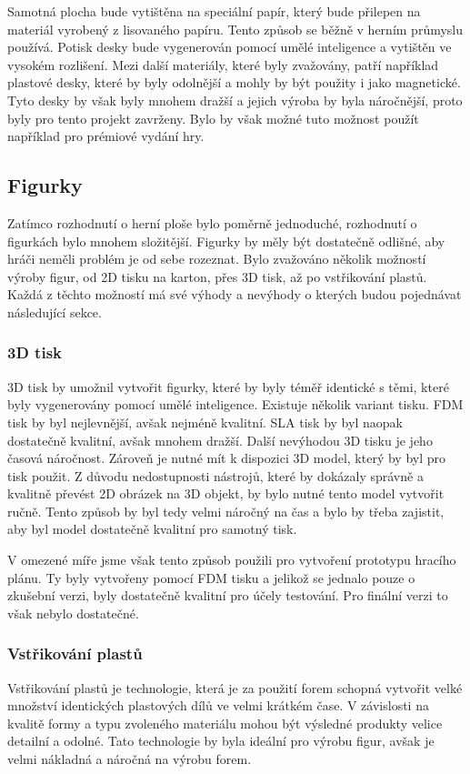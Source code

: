 Samotná plocha bude vytištěna na speciální papír, který bude přilepen na materiál vyrobený z lisovaného papíru. Tento způsob se běžně v herním průmyslu používá. Potisk desky bude vygenerován pomocí umělé inteligence a vytištěn ve vysokém rozlišení. Mezi další materiály, které byly zvažovány, patří například plastové desky, které by byly odolnější a mohly by být použity i jako magnetické. Tyto desky by však byly mnohem dražší a jejich výroba by byla náročnější, proto byly pro tento projekt zavrženy. Bylo by však možné tuto možnost použít například pro prémiové vydání hry.

\subsection{Figurky}
Zatímco rozhodnutí o herní ploše bylo poměrně jednoduché, rozhodnutí o figurkách bylo mnohem složitější. Figurky by měly být dostatečně odlišné, aby hráči neměli problém je od sebe rozeznat. Bylo zvažováno několik možností výroby figur, od 2D tisku na karton, přes 3D tisk, až po vstřikování plastů. Každá z těchto možností má své výhody a nevýhody o kterých budou pojednávat následující sekce.

\subsubsection*{3D tisk}
3D tisk by umožnil vytvořit figurky, které by byly téměř identické s těmi, které byly vygenerovány pomocí umělé inteligence. Existuje několik variant tisku. FDM tisk by byl nejlevnější, avšak nejméně kvalitní. SLA tisk by byl naopak dostatečně kvalitní, avšak mnohem dražší. Další nevýhodou 3D tisku je jeho časová náročnost. Zároveň je nutné mít k dispozici 3D model, který by byl pro tisk použit. Z důvodu nedostupnosti nástrojů, které by dokázaly správně a kvalitně převést 2D obrázek na 3D objekt, by bylo nutné tento model vytvořit ručně. Tento způsob by byl tedy velmi náročný na čas a bylo by třeba zajistit, aby byl model dostatečně kvalitní pro samotný tisk.

V omezené míře jsme však tento způsob použili pro vytvoření prototypu hracího plánu. Ty byly vytvořeny pomocí FDM tisku a jelikož se jednalo pouze o zkušební verzi, byly dostatečně kvalitní pro účely testování. Pro finální verzi to však nebylo dostatečné.

\subsubsection*{Vstřikování plastů}
Vstřikování plastů je technologie, která je za použití forem schopná vytvořit velké množství identických plastových dílů ve velmi krátkém čase. V závislosti na kvalitě formy a typu zvoleného materiálu mohou být výsledné produkty velice detailní a odolné. Tato technologie by byla ideální pro výrobu figur, avšak je velmi nákladná a náročná na výrobu forem.

